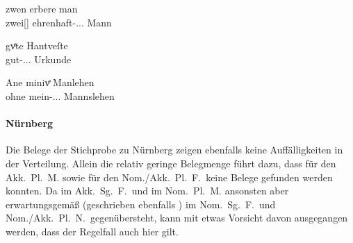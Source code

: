 \begin{exe}
\ex \label{ex:adjaugs}
	\begin{xlist}
	\ex \label{ex:adjaugs_1}
		\gll zwen erbere man \\
			zwei[\MascM] ehrenhaft-\Nom.\Pl.\MascM.\St{} Mann \\
		\begin{taggedline}{\parencites(Augsburg, 1290)[\pno~1270, 508.40]{cao2}}
		\trans {}
		\end{taggedline}

	\ex \label{ex:adjaugs_2}
		\gll gvͤte Hantveſte \\
			gut-\Acc.\Pl.\FemI.\St{} Urkunde \\
		\begin{taggedline}{\parencites(Augsburg, 1299)[\pno~3471, 557.21]{cao4}}
		\trans {}
		\end{taggedline}

	\ex \label{ex:adjaugs_3}
		\gll Ane minivͤ Manlehen \\
			ohne mein-\Acc.\Pl.\NeutI.\St{} Mannslehen \\
		\begin{taggedline}{\parencites(Augsburg, 1291)[\pno~1363, 586.9]{cao2}}
		\trans {}
		\end{taggedline}
	\end{xlist}
\end{exe}

\paragraph{Nürnberg}
\label{par:adjnuernberg}
Die Belege der Stichprobe zu Nürnberg zeigen ebenfalls keine Auffälligkeiten in
der Verteilung. Allein die relativ geringe Belegmenge führt dazu, dass für den
Akk.\ Pl.\ M. sowie für den Nom./Akk.\ Pl.\ F.\ keine Belege gefunden werden
konnten. Da  im Akk.\ Sg.\ F.\ und im Nom.\ Pl.\ M. ansonsten aber
erwartungsgemäß  (geschrieben ebenfalls ) im Nom.\ Sg.\ F.\
und Nom./Akk.\ Pl.\ N.\ gegenübersteht, kann mit etwas Vorsicht davon
ausgegangen werden, dass der Regelfall auch hier gilt.

